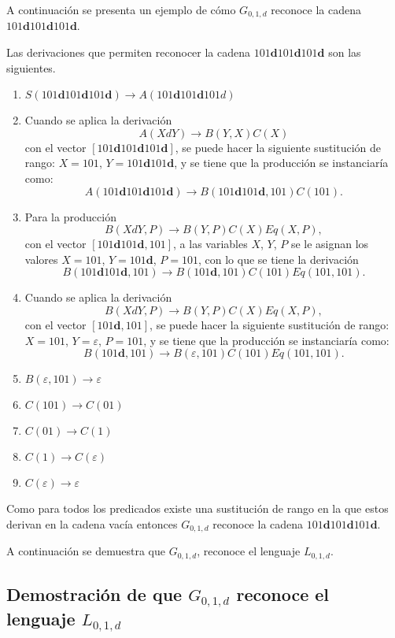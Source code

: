 \documentclass[12pt]{article}
\begin{document}
A continuación se presenta un ejemplo de cómo $G_{0,1,d}$ reconoce la cadena $101\mathbf{d}101\mathbf{d}101\mathbf{d}$.

Las derivaciones que permiten reconocer la cadena $101\mathbf{d}101\mathbf{d}101\mathbf{d}$ son las siguientes.


\begin{enumerate}
    \item $S(101\mathbf{d}101\mathbf{d}101\mathbf{d}) \to A(101\mathbf{d}101\mathbf{d}101d)$
    \item Cuando se aplica la derivación
          $$A(XdY)\to B(Y,X)C(X)$$
          con el vector  $[101\mathbf{d}101\mathbf{d}101\mathbf{d}]$, se puede hacer la siguiente sustitución de rango: $X=101$, $Y=101\mathbf{d}101\mathbf{d}$, y se tiene que la producción se instanciaría como:
          $$A(101\mathbf{d}101\mathbf{d}101\mathbf{d}) \to B(101\mathbf{d}101\mathbf{d},101)C(101).$$
    \item Para la producción $$B(XdY,P)\to B(Y,P) C(X) Eq(X,P),$$
          con el vector $[101\mathbf{d}101\mathbf{d},101]$, a las variables $X$, $Y$, $P$ se le asignan los valores $X=101$, $Y=101\mathbf{d}$, $P=101$, con lo que se tiene la derivación 
          $$B(101\mathbf{d}101\mathbf{d},101) \to B(101\mathbf{d},101)C(101)Eq(101,101).$$
    \item Cuando se aplica la derivación
          $$B(XdY,P)\to B(Y,P) C(X) Eq(X,P),$$
          con el vector $[101\mathbf{d},101]$, se puede hacer la siguiente sustitución de rango: $X=101$, $Y=\varepsilon$, $P=101$, y se tiene que la producción se instanciaría como:
          $$B(101\mathbf{d},101) \to B(\varepsilon,101)C(101)Eq(101,101).$$
    \item $B(\varepsilon,101) \to \varepsilon$
    \item $C(101)\to C(01)$
    \item $C(01)\to C(1)$
    \item $C(1)\to C(\varepsilon)$
    \item $C(\varepsilon)\to \varepsilon$
\end{enumerate}

Como para todos los predicados existe una sustitución de rango en la que estos derivan en la cadena vacía entonces  $G_{0,1,d}$ reconoce la cadena $101\mathbf{d}101\mathbf{d}101\mathbf{d}$.

A continuación se demuestra que $G_{0,1,d}$, reconoce el lenguaje $L_{0,1,d}$.

\subsection{Demostración de que $G_{0,1,d}$ reconoce el lenguaje $L_{0,1,d}$}
\label{sec:demg01d}
\end{document}
